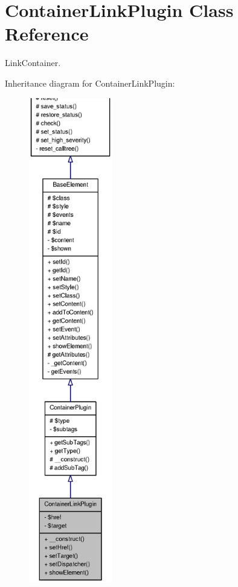 \section{ContainerLinkPlugin Class Reference}
\label{classContainerLinkPlugin}


LinkContainer.  




Inheritance diagram for ContainerLinkPlugin:\nopagebreak
\begin{figure}[H]
\begin{center}
\leavevmode
\includegraphics[height=600pt]{classContainerLinkPlugin__inherit__graph}
\end{center}
\end{figure}


